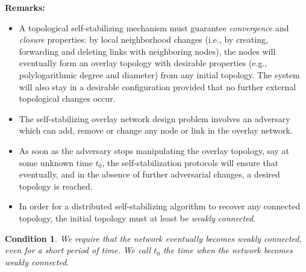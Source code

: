 \documentclass[a4paper,10pt,openany, oneside]{book}
\newtheorem{condition}{Condition}[chapter]
\newlength{\remarkskip}
\newenvironment{remarks}[1][Remarks]{\vspace{\remarkskip}
\needspace{3\baselineskip}
\noindent\textbf{#1:}\begin{itemize}[leftmargin=1.5cm]}{\end{itemize}}
\begin{document}
\begin{remarks}
  \item
    A topological self-stabilizing mechanism must guarantee
    \emph{convergence} and \emph{closure} properties: by local
    neighborhood changes (i.e., by creating, forwarding and deleting
    links with neighboring nodes), the nodes will eventually form an
    overlay topology with desirable properties (e.g., polylogarithmic
    degree and diameter) from any initial topology.
    The system will also stay in a desirable configuration provided
    that no further external topological changes occur.
  \item
    The self-stabilizing overlay network design problem involves an adversary which can add, remove or change any node or link in the overlay network.
  \item
    As soon as the adversary stops manipulating the overlay
    topology, say at some unknown time $t_0$, the self-stabilization
    protocols will ensure that eventually, and in the absence of
    further adversarial changes, a desired topology is reached.
  \item
    In order for a distributed self-stabilizing algorithm to recover
    any connected topology, the initial topology must at least be
    \emph{weakly connected}.
  \end{remarks}




    



  
\begin{condition} \label{conn}
  We require that the network eventually becomes weakly connected, even for a short period of time.
  We call $t_0$ the time when the network becomes weakly connected.
\end{condition}
\end{document}
